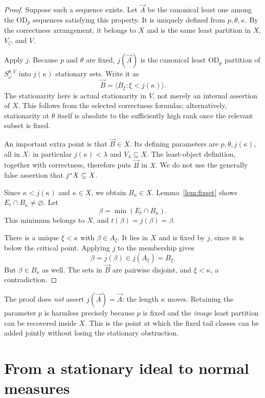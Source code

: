 \documentclass[11pt,letterpaper]{article}
\theoremstyle{definition}
\numberwithin{equation}{section}
\newcommand{\OD}{\mathrm{OD}}
\begin{document}
\begin{proof}
Suppose such a sequence exists. Let $\vec A$ be the canonical least one among the $\OD_p$ sequences satisfying this property. It is uniquely defined from $p,\theta,\kappa$. By the correctness arrangement, it belongs to $X$ and is the same least partition in $X$, $V_\zeta$, and $V$.

Apply $j$. Because $p$ and $\theta$ are fixed, $j(\vec A)$ is the canonical least $\OD_p$ partition of $S_\omega^{\theta,V}$ into $j(\kappa)$ stationary sets. Write it as
\[
\vec B=\langle B_\xi:\xi<j(\kappa)\rangle.
\]
The stationarity here is actual stationarity in $V$, not merely an internal assertion of $X$. This follows from the selected correctness formulas; alternatively, stationarity at $\theta$ itself is absolute to the sufficiently high rank once the relevant subset is fixed.

An important extra point is that $\vec B\in X$. Its defining parameters are $p,\theta,j(\kappa)$, all in $X$: in particular $j(\kappa)<\lambda$ and $V_\lambda\subseteq X$. The least-object definition, together with correctness, therefore puts $\vec B$ in $X$. We do not use the generally false assertion that $j``X\subseteq X$.

Since $\kappa<j(\kappa)$ and $\kappa\in X$, we obtain $B_\kappa\in X$. Lemma~\ref{lem:fixset} shows $E_t\cap B_\kappa\neq\varnothing$. Let
\[
\beta=\min(E_t\cap B_\kappa).
\]
This minimum belongs to $X$, and $t(\beta)=j(\beta)=\beta$.

There is a unique $\xi<\kappa$ with $\beta\in A_\xi$. It lies in $X$ and is fixed by $j$, since it is below the critical point. Applying $j$ to the membership gives
\[
\beta=j(\beta)\in j(A_\xi)=B_\xi.
\]
But $\beta\in B_\kappa$ as well. The sets in $\vec B$ are pairwise disjoint, and $\xi<\kappa$, a contradiction.
\end{proof}

The proof does \emph{not} assert $j(\vec A)=\vec A$: the length $\kappa$ moves. Retaining the parameter $p$ is harmless precisely because $p$ is fixed and the \emph{image} least partition can be recovered inside $X$. This is the point at which the fixed tail classes can be added jointly without losing the stationary obstruction.

\section{From a stationary ideal to normal measures}\label{sec:ideal}
\end{document}
